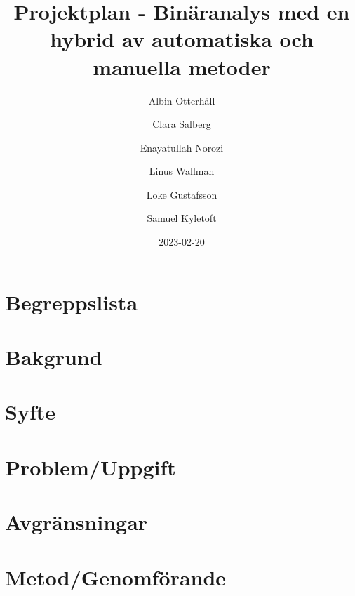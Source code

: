 \documentclass[12pt, a4paper]{article}
\title{Projektplan - Binäranalys med en hybrid av automatiska och manuella metoder}
\author{
    Albin Otterhäll \and
    Clara Salberg \and
    Enayatullah Norozi \and
    Linus Wallman \and
    Loke Gustafsson \and
    Samuel Kyletoft
}
\date{2023-02-20}
\begin{document}
%
\newcommand{\stoe}{S$^2$E}

\maketitle

\newpage

\newpage

\tableofcontents
\newpage

\section*{Begreppslista}


\newpage

\section{Bakgrund}


\section{Syfte}


\section{Problem/Uppgift}


\section{Avgränsningar}


\section{Metod/Genomförande}


\end{document}
